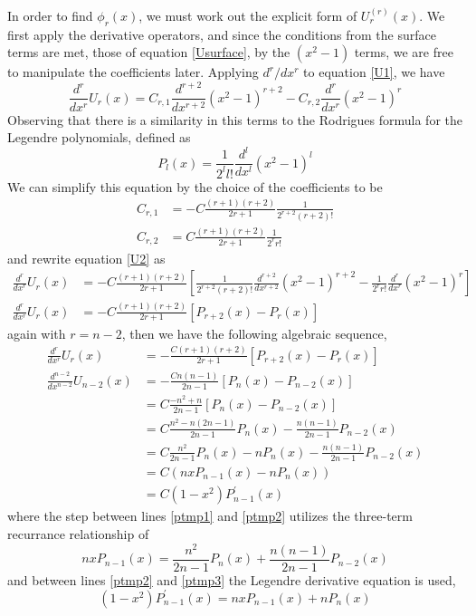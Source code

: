 In order to find $\phi_r(x)$, we must work out the explicit form of $U_r^{(r)}(x)$. 
We first apply the derivative operators, and since the conditions from the surface terms
are met, those of equation \ref{Usurface}, by the $(x^2-1)$ terms, we are free to 
manipulate the coefficients later. Applying $d^r/dx^r$ to equation \ref{U1}, we have
\begin{equation}
\label{U2}
\frac{d^r}{dx^r}U_r(x)=C_{r,1}\frac{d^{r+2}}{dx^{r+2}}(x^2-1)^{r+2}-C_{r,2}\frac{d^r}{dx^r}(x^2-1)^r
\end{equation}
Observing that there is a similarity in this terms to the Rodrigues formula for the 
Legendre polynomials, defined as
\begin{equation}
\label{RodriguesLegendre}
P_l(x)=\frac{1}{2^ll!}\frac{d^l}{dx^l}(x^2-1)^l
\end{equation}
We can simplify this equation by the choice of the coefficients to be
\begin{align}
\label{Crcoef1}
C_{r,1}&=-C\frac{(r+1)(r+2)}{2r+1}\frac{1}{2^{r+2}(r+2)!} \\
\label{Crcoef2}
C_{r,2}&=C\frac{(r+1)(r+2)}{2r+1}\frac{1}{2^{r}r!} 
\end{align}
and rewrite equation \ref{U2} as
\begin{align}
\frac{d^r}{dx^r}U_r(x) &= -C\frac{(r+1)(r+2)}{2r+1}\left[ \frac{1}{2^{r+2}(r+2)!}\frac{d^{r+2}}{dx^{r+2}}(x^2-1)^{r+2}-\frac{1}{2^rr!}\frac{d^r}{dx^r}(x^2-1)^r\right] \\
\frac{d^r}{dx^r}U_r(x)&=-C \frac{(r+1)(r+2)}{2r+1}\left[ P_{r+2}(x)-P_r(x) \right] 
\end{align}
again with $r=n-2$, then we have the following algebraic sequence, 
\begin{align}
\frac{d^r}{dx^r}U_r(x) &= -\frac{C(r+1)(r+2)}{2r+1}\left[ P_{r+2}(x)-P_r(x) \right]  \\
\frac{d^{n-2}}{dx^{n-2}}U_{n-2}(x) &= -\frac{Cn(n-1)}{2n-1}\left[ P_{n}(x)-P_{n-2}(x) \right]  \\
 &= C\frac{-n^2+n}{2n-1}\left[ P_{n}(x)-P_{n-2}(x) \right]  \\
 &= C\frac{n^2-n(2n-1)}{2n-1}P_{n}(x)-\frac{n(n-1)}{2n-1}P_{n-2}(x)   \\
\label{ptmp1}
 &= C\frac{n^2}{2n-1}P_n(x)-nP_{n}(x)-\frac{n(n-1)}{2n-1}P_{n-2}(x)   \\
\label{ptmp2}
 &= C\left(nxP_{n-1}(x)-nP_{n}(x)\right)\\
\label{ptmp3}
 &=C(1-x^2)P_{n-1}^\prime(x)
\end{align}
where the step between lines \ref{ptmp1} and \ref{ptmp2} utilizes the three-term
recurrance relationship of 
\begin{equation}
nxP_{n-1}(x)=\frac{n^2}{2n-1}P_n(x)+\frac{n(n-1)}{2n-1}P_{n-2}(x)
\end{equation}
and between lines \ref{ptmp2} and \ref{ptmp3} the Legendre derivative 
equation is used, 
\begin{equation}
(1-x^2)P_{n-1}^\prime(x)=nxP_{n-1}(x)+nP_{n}(x)
\end{equation}

